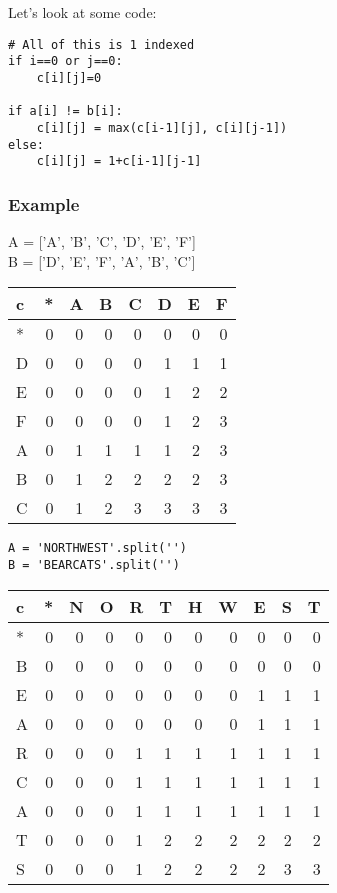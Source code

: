 \documentclass{article}
\begin{document}
Let's look at some code:

\begin{verbatim}
# All of this is 1 indexed
if i==0 or j==0:
    c[i][j]=0

if a[i] != b[i]:
    c[i][j] = max(c[i-1][j], c[i][j-1])
else:
    c[i][j] = 1+c[i-1][j-1]
\end{verbatim}

\subsubsection{Example}
\label{sec:org643b5b0}
A = ['A', 'B', 'C', 'D', 'E', 'F'] \\
B = ['D', 'E', 'F', 'A', 'B', 'C'] \\

\begin{center}
\begin{tabular}{|l|r|rrrrrr|}
c & * & A & B & C & D & E & F\\
\hline
* & 0 & 0 & 0 & 0 & 0 & 0 & 0\\
\hline
D & 0 & 0 & 0 & 0 & 1 & 1 & 1\\
E & 0 & 0 & 0 & 0 & 1 & 2 & 2\\
F & 0 & 0 & 0 & 0 & 1 & 2 & 3\\
A & 0 & 1 & 1 & 1 & 1 & 2 & 3\\
B & 0 & 1 & 2 & 2 & 2 & 2 & 3\\
C & 0 & 1 & 2 & 3 & 3 & 3 & 3\\
\end{tabular}
\end{center}

\begin{verbatim}
A = 'NORTHWEST'.split('')
B = 'BEARCATS'.split('')
\end{verbatim}

\begin{center}
\begin{tabular}{|l|r|rrrrrrrrr|}
c & * & N & O & R & T & H & W & E & S & T\\
\hline
* & 0 & 0 & 0 & 0 & 0 & 0 & 0 & 0 & 0 & 0\\
\hline
B & 0 & 0 & 0 & 0 & 0 & 0 & 0 & 0 & 0 & 0\\
E & 0 & 0 & 0 & 0 & 0 & 0 & 0 & 1 & 1 & 1\\
A & 0 & 0 & 0 & 0 & 0 & 0 & 0 & 1 & 1 & 1\\
R & 0 & 0 & 0 & 1 & 1 & 1 & 1 & 1 & 1 & 1\\
C & 0 & 0 & 0 & 1 & 1 & 1 & 1 & 1 & 1 & 1\\
A & 0 & 0 & 0 & 1 & 1 & 1 & 1 & 1 & 1 & 1\\
T & 0 & 0 & 0 & 1 & 2 & 2 & 2 & 2 & 2 & 2\\
S & 0 & 0 & 0 & 1 & 2 & 2 & 2 & 2 & 3 & 3\\
\end{tabular}
\end{center}
\end{document}
